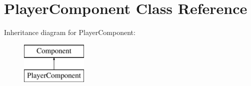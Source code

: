 \hypertarget{class_player_component}{}\section{Player\+Component Class Reference}
\label{class_player_component}
Inheritance diagram for Player\+Component\+:\begin{figure}[H]
\begin{center}
\leavevmode
\includegraphics[height=2.000000cm]{class_player_component}
\end{center}
\end{figure}

